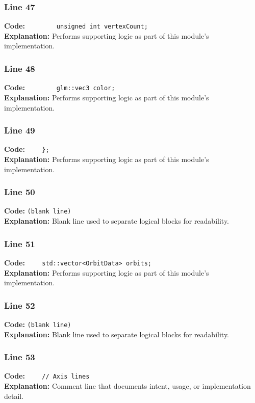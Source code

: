 \documentclass[11pt,a4paper]{article}
\begin{document}
\subsubsection*{Line 47}
\textbf{Code:} \verb|        unsigned int vertexCount;|\\
\textbf{Explanation:} Performs supporting logic as part of this module's implementation.

\subsubsection*{Line 48}
\textbf{Code:} \verb|        glm::vec3 color;|\\
\textbf{Explanation:} Performs supporting logic as part of this module's implementation.

\subsubsection*{Line 49}
\textbf{Code:} \verb|    };|\\
\textbf{Explanation:} Performs supporting logic as part of this module's implementation.

\subsubsection*{Line 50}
\textbf{Code:} \texttt{(blank line)}\\
\textbf{Explanation:} Blank line used to separate logical blocks for readability.

\subsubsection*{Line 51}
\textbf{Code:} \verb|    std::vector<OrbitData> orbits;|\\
\textbf{Explanation:} Performs supporting logic as part of this module's implementation.

\subsubsection*{Line 52}
\textbf{Code:} \texttt{(blank line)}\\
\textbf{Explanation:} Blank line used to separate logical blocks for readability.

\subsubsection*{Line 53}
\textbf{Code:} \verb|    // Axis lines|\\
\textbf{Explanation:} Comment line that documents intent, usage, or implementation detail.
\end{document}
